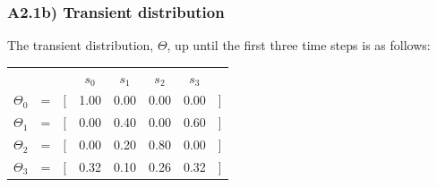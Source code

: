 \documentclass[12pt]{report}
\begin{document}
\subsubsection*{A2.1b) Transient distribution}
The transient distribution, $\Theta$, up until the first three time steps is as follows:
\begin{center}
	\begin{tabular}{c c c c c c c c}
	& & & $s_0$ & $s_1$ & $s_2$ & $s_3$\\
	$\Theta_0$ & = & [ & 1.00 & 0.00 & 0.00 & 0.00 & ]\\
	$\Theta_1$ & = & [ & 0.00 & 0.40 & 0.00 & 0.60 & ]\\
	$\Theta_2$ & = & [ & 0.00 & 0.20 & 0.80 & 0.00 & ]\\
	$\Theta_3$ & = & [ & 0.32 & 0.10 & 0.26 & 0.32 & ]
	\end{tabular}
\end{center}
\end{document}
